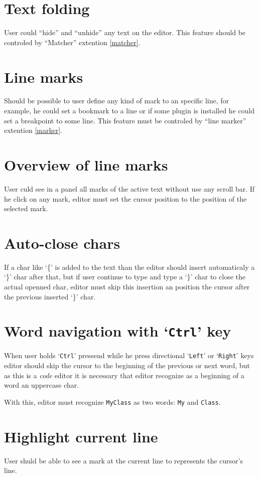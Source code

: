 \documentclass[11pt,a4paper]{report}
\begin{document}
\section{Text folding}
User could ``hide'' and ``unhide'' any text on the editor. This feature should be controled by ``Matcher'' extention \ref{matcher}.

\section{Line marks}
Should be possible to user define any kind of mark to an specific line, for example, he could set a bookmark to a line or if some plugin is installed he could set a breakpoint to some line. This feature must be controled by ``line marker'' extention \ref{marker}.

\section{Overview of line marks}
User culd see in a panel all marks of the active text without use any scroll bar. If he click on any mark, editor must set the cursor position to the position of the selected mark.

\section{Auto-close chars}
If a char like `\{' is added to the text than the editor should insert automaticaly a `\}' char after that, but if user continue to type and type a `\}' char to close the actual openned char, editor must skip this insertion an position the cursor after the previous inserted `\}' char.

\section{Word navigation with `\texttt{Ctrl}' key}
When user holds `\texttt{Ctrl}' pressend while he press directional `\texttt{Left}' or `\texttt{Right}' keys editor should skip the cursor to the beginning of the previous or next word, but as this is a \textit{code} editor it is necessary that editor recognize as a beginning of a word an uppercase char.

With this, editor must recognize \texttt{MyClass} as two words: \texttt{My} and \texttt{Class}.

\section{Highlight current line}
User shuld be able to see a mark at the current line to represents the cursor's line.
\end{document}
